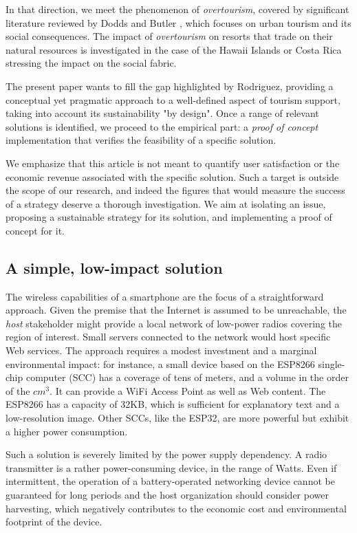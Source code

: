 \documentclass[sustainability,article,submit,pdftex,moreauthors]{Definitions/mdpi}
\begin{document}
In that direction, we meet the phenomenon of {\em overtourism}, covered by significant literature reviewed by Dodds and Butler \cite{dod19a}, which focuses on urban tourism and its social consequences. The impact of {\em overtourism} on resorts that trade on their natural resources is investigated in the case of the Hawaii Islands \cite{lin22a} or Costa Rica \cite{mat10a} stressing the impact on the social fabric.

The present paper wants to fill the gap highlighted by Rodriguez, providing a conceptual yet pragmatic approach to a well-defined aspect of tourism support, taking into account its sustainability "by design". Once a range of relevant solutions is identified, we proceed to the empirical part: a {\em proof of concept} implementation that verifies the feasibility of a specific solution.

We emphasize that this article is not meant to quantify user satisfaction or the economic revenue associated with the specific solution. Such a target is outside the scope of our research, and indeed the figures that would measure the success of a strategy deserve a thorough investigation. We aim at isolating an issue, proposing a sustainable strategy for its solution, and implementing a proof of concept for it.

\subsection{A simple, low-impact solution}


The wireless capabilities of a smartphone are the focus of a straightforward approach. Given the premise that the Internet is assumed to be unreachable, the {\em host} stakeholder might provide a local network of low-power radios covering the region of interest. Small servers connected to the network would host specific Web services. The approach requires a modest investment and a marginal environmental impact: for instance, a small device based on the ESP8266 single-chip computer (SCC) has a coverage of tens of meters, and a volume in the order of the $cm^3$. It can provide a WiFi Access Point as well as Web content. The ESP8266 has a capacity of 32KB, which is sufficient for explanatory text and a low-resolution image. Other SCCs, like the ESP32, are more powerful but exhibit a higher power consumption. 

Such a solution is severely limited by the power supply dependency. A radio transmitter is a rather power-consuming device, in the range of Watts. Even if intermittent, the operation of a battery-operated networking device cannot be guaranteed for long periods and the host organization should consider power harvesting, which negatively contributes to the economic cost and environmental footprint of the device.
\end{document}
